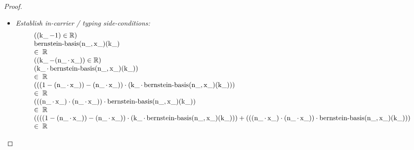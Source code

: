 \documentclass[11pt]{article}
\theoremstyle{plain}
\begin{document}
\begin{proof}
\begin{itemize}[leftmargin=2.8em, itemsep=4pt, parsep=1pt]
  \item[\textbf{70--77}] \emph{Establish in-carrier / typing side-conditions:}
\begin{equation*}
\begin{array}{@{}l@{}}
((\operatorname{k\_} - 1) \in \mathbb{R}) \\
\begin{array}{@{}l@{}} \operatorname{bernstein\text{-}basis}(\operatorname{n\_}, \operatorname{x\_})(\operatorname{k\_}) \\ \in\; \mathbb{R} \end{array} \\
((\operatorname{k\_} - (\operatorname{n\_} \cdot \operatorname{x\_})) \in \mathbb{R}) \\
\begin{array}{@{}l@{}} (\operatorname{k\_} \cdot \operatorname{bernstein\text{-}basis}(\operatorname{n\_}, \operatorname{x\_})(\operatorname{k\_})) \\ \in\; \mathbb{R} \end{array} \\
\begin{array}{@{}l@{}} (((1 - (\operatorname{n\_} \cdot \operatorname{x\_})) - (\operatorname{n\_} \cdot \operatorname{x\_})) \cdot (\operatorname{k\_} \cdot \operatorname{bernstein\text{-}basis}(\operatorname{n\_}, \operatorname{x\_})(\operatorname{k\_}))) \\ \in\; \mathbb{R} \end{array} \\
\begin{array}{@{}l@{}} (((\operatorname{n\_} \cdot \operatorname{x\_}) \cdot (\operatorname{n\_} \cdot \operatorname{x\_})) \cdot \operatorname{bernstein\text{-}basis}(\operatorname{n\_}, \operatorname{x\_})(\operatorname{k\_})) \\ \in\; \mathbb{R} \end{array} \\
\begin{array}{@{}l@{}} ((((1 - (\operatorname{n\_} \cdot \operatorname{x\_})) - (\operatorname{n\_} \cdot \operatorname{x\_})) \cdot (\operatorname{k\_} \cdot \operatorname{bernstein\text{-}basis}(\operatorname{n\_}, \operatorname{x\_})(\operatorname{k\_}))) + (((\operatorname{n\_} \cdot \operatorname{x\_}) \cdot (\operatorname{n\_} \cdot \operatorname{x\_})) \cdot \operatorname{bernstein\text{-}basis}(\operatorname{n\_}, \operatorname{x\_})(\operatorname{k\_}))) \\ \in\; \mathbb{R} \end{array}

\end{array}
\end{equation*}
\end{itemize}
\end{proof}
\end{document}
